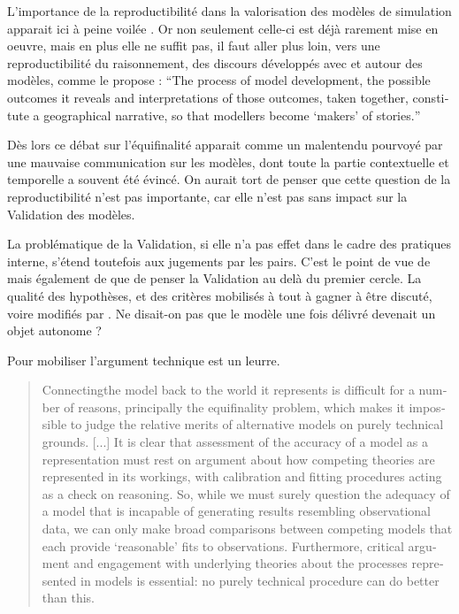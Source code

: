 
L'importance de la reproductibilité dans la valorisation des modèles de simulation  apparait ici à peine voilée \autocites{Amblard2006, Wilensky2007a, Rouchier2013}. Or non seulement celle-ci est déjà rarement mise en oeuvre, mais en plus elle ne suffit pas, il faut aller plus loin, vers une reproductibilité du raisonnement, des discours développés avec et autour des modèles, comme le propose \textcite{OSullivan2004} : \foreignquote{english}{The process of model development, the possible outcomes it reveals and interpretations of those outcomes, taken together, constitute a geographical narrative, so that modellers become ‘makers’ of stories.}

Dès lors ce débat sur l'équifinalité apparait comme un malentendu pourvoyé par une mauvaise communication sur les modèles, dont toute la partie contextuelle et temporelle a souvent été évincé. On aurait tort de penser que cette question de la reproductibilité n'est pas importante, car elle n'est pas sans impact sur la Validation des modèles. 

La problématique de la Validation, si elle n'a pas effet dans le cadre des pratiques interne, s'étend toutefois aux jugements par les pairs. C'est le point de vue de \textcite{OSullivan2004} mais également de \textcite{Rouchier2013} que de penser la Validation au delà du premier cercle. La qualité des hypothèses, et des critères mobilisés à tout à gagner à être discuté, voire modifiés par . Ne disait-on pas que le modèle une fois délivré devenait un objet autonome ?

Pour \autocite{OSullivan2004} mobiliser l'argument technique est un leurre. 

\foreignblockquote{english}[\cite{OSullivan2004}]{Connectingthe model back to the world it represents is difficult for a number of reasons, principally the equifinality problem, which makes it impossible to judge the relative merits of alternative models on purely technical grounds. [...] It is clear that assessment of the accuracy of a model as a representation must rest on argument about how competing theories are represented in its workings, with calibration and fitting procedures acting as a check on reasoning. So, while we must surely question the adequacy of a model that is incapable of generating results resembling observational data, we can only make broad comparisons between competing models that each provide ‘reasonable’ fits to observations. Furthermore, critical argument and engagement with underlying theories about the processes represented in models is essential: no purely technical procedure can do better than this.}

